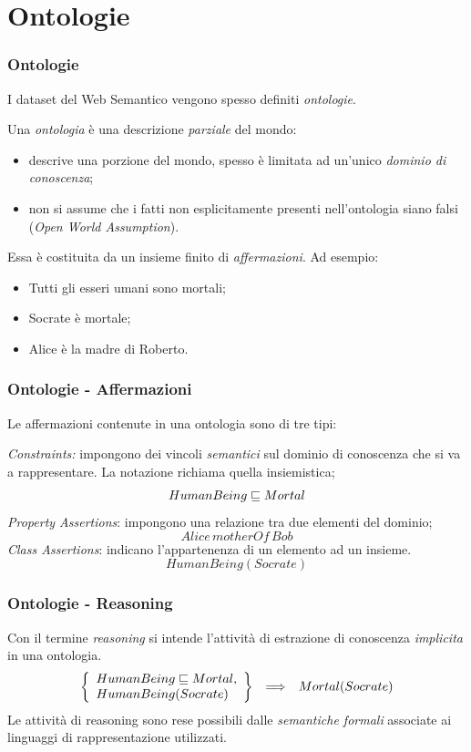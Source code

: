 \documentclass[8pt]{beamer}
\begin{document}
\section{Ontologie}
\begin{frame}
\frametitle{Ontologie}
I dataset del Web Semantico vengono spesso definiti \emph{ontologie}.
\vspace{\baselineskip}

Una \emph{ontologia} \`e una descrizione \emph{parziale} del mondo:
\begin{itemize}
 \item descrive una porzione del mondo, spesso \`e limitata ad un'unico \emph{dominio di conoscenza};
 \item non si assume che i fatti non esplicitamente presenti nell'ontologia siano falsi (\emph{Open World Assumption}).
\end{itemize}
\vspace{\baselineskip}

Essa \`e costituita da un insieme finito di \emph{affermazioni}. Ad esempio:
\begin{itemize}
 \item Tutti gli esseri umani sono mortali;
 \item Socrate \`e mortale;
 \item Alice \`e la madre di Roberto.
\end{itemize}
\end{frame}

\begin{frame}
\frametitle{Ontologie - Affermazioni}
Le affermazioni contenute in una ontologia sono di tre tipi:
\vspace{\baselineskip}

\emph{Constraints:} impongono dei vincoli \emph{semantici} sul dominio di conoscenza 
che si va a rappresentare. La notazione richiama quella insiemistica;
\vspace{\baselineskip}
\[
 HumanBeing \sqsubseteq Mortal 
\]
\emph{Property Assertions}: impongono una relazione tra due elementi del dominio;
\[
 Alice\,motherOf\,Bob 
\]
\emph{Class Assertions}: indicano l'appartenenza di un elemento ad un insieme.
\[
 HumanBeing(Socrate) 
\]
\end{frame}

\begin{frame}
\frametitle{Ontologie - Reasoning}

Con il termine \emph{reasoning} si intende l'attivit\`a di estrazione di 
conoscenza \emph{implicita} in una ontologia.
\[
\begin{array}{ccc}
\left \{ \begin{array}{l}
HumanBeing \sqsubseteq Mortal , \\
HumanBeing(Socrate)  
\end{array} \right \}&\Longrightarrow &  Mortal(Socrate)\\
\end{array}
\]
Le attivit\`a di reasoning sono rese possibili dalle \emph{semantiche formali}
associate ai linguaggi di rappresentazione utilizzati.
\end{frame}
\end{document}
